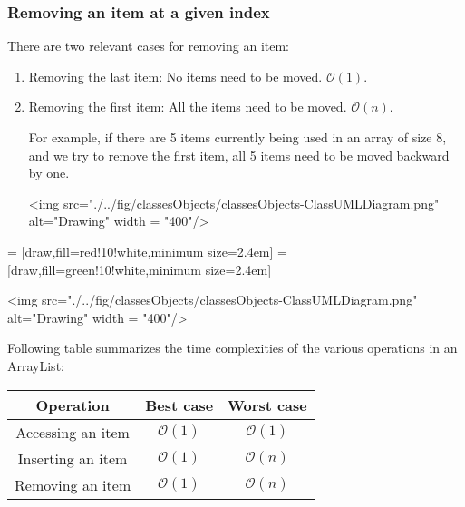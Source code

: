 \subsubsection{Removing an item at a given index}

There are two relevant cases for removing an item:

\begin{enumerate}
\item Removing the last item: No items need to be moved. $\mathcal{O}(1)$.
\item Removing the first item: All the items need to be moved. $\mathcal{O}(n)$.

For example, if there are 5 items currently being used in an array of size 8, and we try to remove the first item, all 5 items need to be moved backward by one.

<img src="./../fig/classesObjects/classesObjects-ClassUMLDiagram.png" alt="Drawing" width = "400"/>
\end{enumerate}

 = [draw,fill=red!10!white,minimum size=2.4em]
 = [draw,fill=green!10!white,minimum size=2.4em]

\newcommand{\data}{{{12.5, 6.4, 8.5, 9.6, -3.4, 0, 0, 0},
					{6.4, 6.4, 8.5, 9.6, -3.4, 0, 0, 0},
					{6.4, 8.5, 8.5, 9.6, -3.4, 0, 0, 0},
					{6.4, 8.5, 9.6, 9.6, -3.4, 0, 0, 0},
					{6.4, 8.5, 9.6, -3.4, -3.4, 0, 0, 0},
					{6.4, 8.5, 9.6, -3.4, -3.4, 0, 0, 0}}}
<img src="./../fig/classesObjects/classesObjects-ClassUMLDiagram.png" alt="Drawing" width = "400"/>

\vskip 1cm

Following table summarizes the time complexities of the various operations in an ArrayList:

\Large
\begin{center}
  \begin{tabular}{c|c|c}
    Operation & Best case & Worst case\\
    \hline
    Accessing an item & \color{ForestGreen} $\mathcal{O}(1)$ \color{black} & \color{ForestGreen} $\mathcal{O}(1)$ \color{black}\\
    \hline
    Inserting an item & \color{ForestGreen} $\mathcal{O}(1)$ \color{black} & \color{red} $\mathcal{O}(n)$ \color{black} \\
    \hline
    Removing an item & \color{ForestGreen} $\mathcal{O}(1)$ \color{black} & \color{red} $\mathcal{O}(n)$ \color{black}
  \end{tabular}
\end{center}
\normalsize

